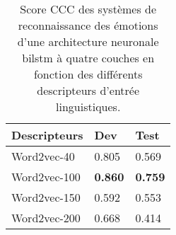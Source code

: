 \begin{table}[h]
  \centering
  \begin{tabular}{|l|l|l|}
  \hline
  Descripteurs   &Dev   &Test  \\
  \hline
  Word2vec-40    &0.805 &0.569 \\
  Word2vec-100   &\textbf{0.860} &\textbf{0.759} \\
  Word2vec-150   &0.592 &0.553 \\
  Word2vec-200   &0.668 &0.414 \\
  \hline
\end{tabular}
\caption{Score CCC des systèmes de reconnaissance des émotions d'une architecture neuronale bilstm à quatre couches en fonction des différents descripteurs d'entrée linguistiques.}
\label{tab:res_word2vec}
\end{table}
